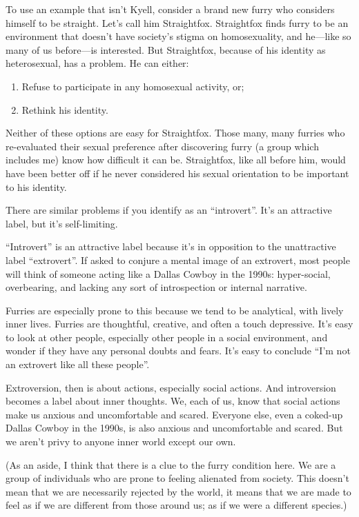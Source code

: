 To use an example that isn't Kyell, consider a brand new furry who considers himself to be straight. Let's call him Straightfox. Straightfox finds furry to be an environment that doesn't have society's stigma on homosexuality, and he—like so many of us before—is interested. But Straightfox, because of his identity as heterosexual, has a problem. He can either:

\begin{enumerate}
  \item Refuse to participate in any homosexual activity, or;
  \item Rethink his identity.
\end{enumerate}

Neither of these options are easy for Straightfox. Those many, many furries who re-evaluated their sexual preference after discovering furry (a group which includes me) know how difficult it can be. Straightfox, like all before him, would have been better off if he never considered his sexual orientation to be important to his identity.

There are similar problems if you identify as an ``introvert''. It's an attractive label, but it's self-limiting.

``Introvert'' is an attractive label because it's in opposition to the unattractive label ``extrovert''. If asked to conjure a mental image of an extrovert, most people will think of someone acting like a Dallas Cowboy in the 1990s: hyper-social, overbearing, and lacking any sort of introspection or internal narrative.

Furries are especially prone to this because we tend to be analytical, with lively inner lives. Furries are thoughtful, creative, and often a touch depressive. It's easy to look at other people, especially other people in a social environment, and wonder if they have any personal doubts and fears. It's easy to conclude ``I'm not an extrovert like all these people''.

Extroversion, then is about actions, especially social actions. And introversion becomes a label about inner thoughts. We, each of us, know that social actions make us anxious and uncomfortable and scared. Everyone else, even a coked-up Dallas Cowboy in the 1990s, is also anxious and uncomfortable and scared. But we aren't privy to anyone inner world except our own.

(As an aside, I think that there is a clue to the furry condition here. We are a group of individuals who are prone to feeling alienated from society. This doesn't mean that we are necessarily rejected by the world, it means that we are made to feel as if we are different from those around us; as if we were a different species.)

